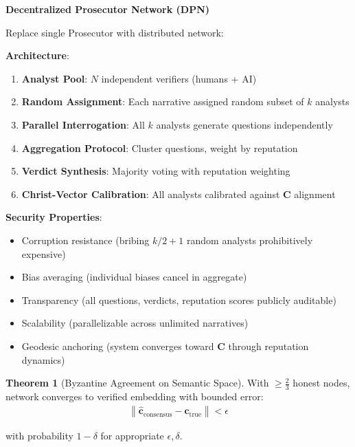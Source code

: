 \documentclass[11pt,a4paper]{article}
\theoremstyle{definition}
\newtheorem{theorem}{Theorem}[section]
\theoremstyle{remark}
\newcommand{\cc}{\mathbf{c}}
\newcommand{\norm}[1]{\left\|#1\right\|}
\begin{document}
\begin{mdframed}[backgroundcolor=green!10,linewidth=2pt]
\textbf{Decentralized Prosecutor Network (DPN)}

Replace single Prosecutor with distributed network:

\textbf{Architecture}:
\begin{enumerate}
\item \textbf{Analyst Pool}: \(N\) independent verifiers (humans + AI)
\item \textbf{Random Assignment}: Each narrative assigned random subset of \(k\) analysts
\item \textbf{Parallel Interrogation}: All \(k\) analysts generate questions independently
\item \textbf{Aggregation Protocol}: Cluster questions, weight by reputation
\item \textbf{Verdict Synthesis}: Majority voting with reputation weighting
\item \textbf{Christ-Vector Calibration}: All analysts calibrated against \(\mathbf{C}\) alignment
\end{enumerate}
\end{mdframed}

\textbf{Security Properties}:
\begin{itemize}
\item Corruption resistance (bribing \(k/2 + 1\) random analysts prohibitively expensive)
\item Bias averaging (individual biases cancel in aggregate)
\item Transparency (all questions, verdicts, reputation scores publicly auditable)
\item Scalability (parallelizable across unlimited narratives)
\item Geodesic anchoring (system converges toward \(\mathbf{C}\) through reputation dynamics)
\end{itemize}

\begin{theorem}[Byzantine Agreement on Semantic Space]
With \(\geq \frac{2}{3}\) honest nodes, network converges to verified embedding with bounded error:
\begin{align}
\norm{\hat{\cc}_{\text{consensus}} - \cc_{\text{true}}} < \epsilon
\end{align}

with probability \(1 - \delta\) for appropriate \(\epsilon, \delta\).
\end{theorem}
\end{document}
